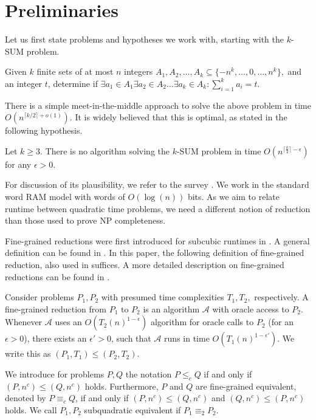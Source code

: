 \section{Preliminaries}\label{sec:prelim}
Let us first state problems and hypotheses we work with, starting with the $k$-SUM problem. 
\begin{definition}
Given $k$ finite sets of at most $n$ integers $A_1, A_2, \dots, A_k\subseteq \{-n^{k},\dots,0, \dots ,n^{k} \},$ and an integer $t$, determine if 
$\exists a_1 \in A_1 \exists a_2 \in A_2 \dots \exists a_k \in A_k: \sum_{i=1}^{k}a_i=t.$
\end{definition}

There is a simple meet-in-the-middle approach to solve the above problem in time $O(n^{\lceil k/2 \rceil+o(1)})$. It is widely
believed that this is optimal, as stated in the following hypothesis.
\begin{hypothesis}
Let $k\geq3$. There is no algorithm solving the $k$-SUM problem in time $O(n^{\lceil \frac{k}{2} \rceil -\epsilon})$ for any $\epsilon>0$.
\end{hypothesis}
For discussion of its plausibility, we refer to the survey \cite{williams2018some}.
We work in the standard word RAM model with words of $O(\log(n))$ bits. As we aim to relate runtime between quadratic time problems, we need 
a different notion of reduction than those used to prove NP completeness.

Fine-grained reductions were first introduced for subcubic runtimes in
\cite{DBLP:conf/focs/WilliamsW10}. A general definition can be found in \cite{williams2018some}.
In this paper, the following definition of fine-grained reduction, also used in \cite{DBLP:conf/approx/BringmannCFK21} suffices. A more detailed description on fine-grained reductions
can be found in \cite{DBLP:conf/innovations/CarmosinoGIMPS16}.

\begin{definition}
Consider problems $P_1, P_2$ with presumed time complexities $T_1,T_2,$ respectively.
A fine-grained reduction from $P_1$ to $P_2$ is an algorithm $\mathcal{A}$ with oracle access to $P_2$. Whenever $\mathcal{A}$
uses an $O(T_2(n)^{1-\epsilon})$ algorithm for oracle calls to $P_2$ (for an $\epsilon>0$), there exists an $\epsilon'>0$,
such that $\mathcal{A}$ runs in time $O(T_1(n)^{1-\epsilon'})$. We write this as $(P_1,T_1) \leq (P_2,T_2).$
\end{definition}
We introduce for problems $P,Q$ the notation $P \leq_{c}Q$ if and only if $(P,n^c) \leq (Q,n^c)$ holds. Furthermore, $P$ and $Q$ are fine-grained equivalent, denoted by
$P \equiv_{c}Q$, if and only if $(P,n^c) \leq (Q,n^c)$ and $(Q,n^c) \leq (P,n^c) $ holds. We call $P_1,P_2$ subquadratic equivalent if $P_1 \equiv_2 P_2$.


